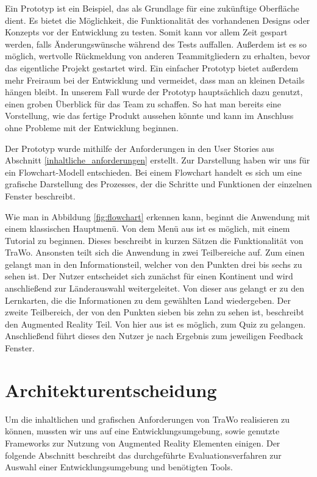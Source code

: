 Ein Prototyp ist ein Beispiel, das als Grundlage für eine zukünftige Oberfläche dient. Es bietet die Möglichkeit, die Funktionalität des vorhandenen Designs oder Konzepts vor der Entwicklung zu testen. Somit kann vor allem Zeit gespart werden, falls Änderungswünsche während des Tests auffallen. Außerdem ist es so möglich, wertvolle Rückmeldung von anderen Teammitgliedern zu erhalten, bevor das eigentliche Projekt gestartet wird. Ein einfacher Prototyp bietet außerdem mehr Freiraum bei der Entwicklung und vermeidet, dass man an kleinen Details hängen bleibt. In unserem Fall wurde der Prototyp hauptsächlich dazu genutzt, einen groben Überblick für das Team zu schaffen. So hat man bereits eine Vorstellung, wie das fertige Produkt aussehen könnte und kann im Anschluss ohne Probleme mit der Entwicklung beginnen.

Der Prototyp wurde mithilfe der Anforderungen in den User Stories aus Abschnitt \ref{inhaltliche_anforderungen} erstellt. Zur Darstellung haben wir uns für ein Flowchart-Modell entschieden. Bei einem Flowchart handelt es sich um eine grafische Darstellung des Prozesses, der die Schritte und Funktionen der einzelnen Fenster beschreibt.

Wie man in Abbildung \ref{fig:flowchart} erkennen kann, beginnt die Anwendung mit einem klassischen Hauptmenü. Von dem Menü aus ist es möglich, mit einem Tutorial zu beginnen. Dieses beschreibt in kurzen Sätzen die Funktionalität von TraWo. Ansonsten teilt sich die Anwendung in zwei Teilbereiche auf. Zum einen gelangt man in den Informationsteil, welcher von den Punkten drei bis sechs zu sehen ist. Der Nutzer entscheidet sich zunächst für einen Kontinent und wird anschließend zur Länderauswahl weitergeleitet. Von dieser aus gelangt er zu den Lernkarten, die die Informationen zu dem gewählten Land wiedergeben. Der zweite Teilbereich, der von den Punkten sieben bis zehn zu sehen ist, beschreibt den Augmented Reality Teil. Von hier aus ist es möglich, zum Quiz zu gelangen. Anschließend führt dieses den Nutzer je nach Ergebnis zum jeweiligen Feedback Fenster.

\section{Architekturentscheidung} \label{architekturentscheidung}
Um die inhaltlichen und grafischen Anforderungen von TraWo realisieren zu können, mussten wir uns auf eine Entwicklungsumgebung, sowie genutzte Frameworks zur Nutzung von Augmented Reality Elementen einigen. Der folgende Abschnitt beschreibt das durchgeführte Evaluationsverfahren zur Auswahl einer Entwicklungsumgebung und benötigten Tools.
